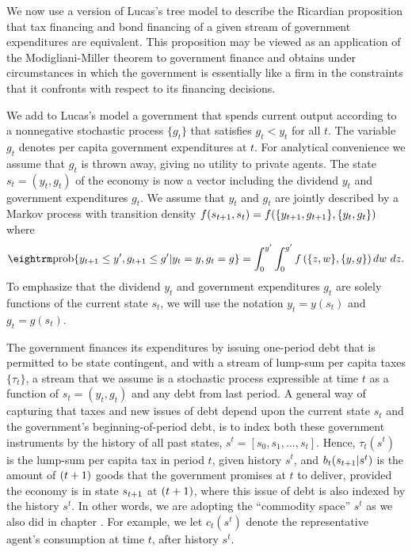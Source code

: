 We now use a version of Lucas's tree model to describe the Ricardian
proposition that tax financing and bond financing of a given stream of
government expenditures are equivalent.  This proposition may
be viewed as an application of the Modigliani-Miller theorem to
government finance and obtains under circumstances in which the government is
essentially like a firm in the constraints that it confronts with respect to
its financing decisions.

We add to Lucas's model a government that spends current output according
to a nonnegative stochastic process $\{g_t\}$ that satisfies $g_t<y_t$ for all
$t$.  The variable $g_t$ denotes per capita government expenditures at $t$.
For analytical convenience we assume that $g_t$ is thrown away, giving  no
utility to private agents.  The state $s_t = (y_t,g_t)$ of the economy is now
a vector including the dividend $y_t$ and government expenditures $g_t$.
We assume that $y_t$ and $g_t$ are jointly described by a Markov process
with transition density $f(s_{{t+1}}, s_t) =
f(\{y_{{t+1}}, g_{{t+1}}\},\{y_t,g_t\})$ where
$${\rm prob} \{y_{\tone}\le y', g_{\tone}\le g'|y_t=y,g_t=g\}
=\int_0^{y'} \int_0^{g'} f\left(\{z,w\},\{y,g\}\right) dw\ dz.$$
To emphasize that the dividend $y_t$ and government expenditures $g_t$
are solely functions of the current state $s_t$, we will use the notation
$y_t=y(s_t)$ and $g_t = g(s_t)$.

The government finances its expenditures by
issuing one-period debt that is permitted to be state contingent, and with a
stream of lump-sum per capita taxes $\{\tau_t\}$, a stream that we assume is a
stochastic process expressible at time $t$ as a function of $s_t = (y_t,g_t)$
and any debt from last period. A general way of capturing that taxes and
new issues of debt depend upon the current state $s_t$ and the government's
beginning-of-period debt, is to index both these government instruments by the
history of all past states, $s^t=[s_0, s_1, \ldots, s_t]$. Hence, $\tau_t(s^t)$
is the lump-sum per capita tax in period $t$, given history $s^t$, and
$b_t(s_{{t+1}}|s^t)$ is the amount of $({t+1})$ goods that the government
promises at $t$ to deliver, provided the economy is in state $s_{{t+1}}$ at
$({t+1})$, where this issue of debt is also indexed by the history $s^t$.
In other words, we are adopting the ``commodity space'' $s^t$ as we also
did in chapter . For example, we let $c_t(s^t)$ denote
the representative agent's consumption at time $t$, after history $s^t$.


